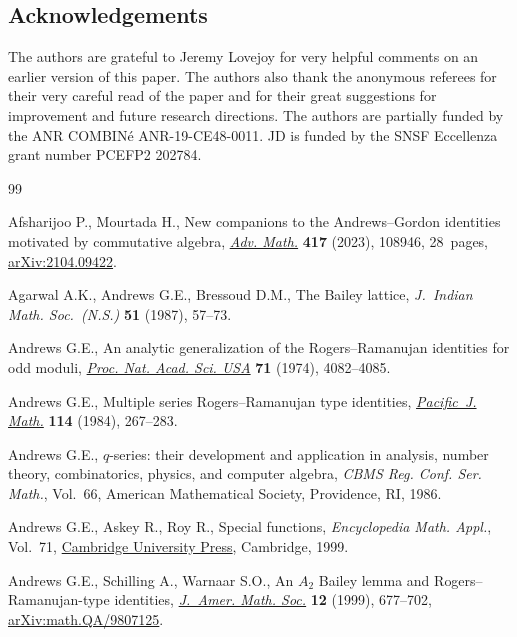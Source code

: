 \documentclass[pdftex]{sigma}
\numberwithin{equation}{section}
\begin{document}
\subsection*{Acknowledgements}

The authors are grateful to Jeremy Lovejoy for very helpful comments on an earlier version of this paper. The authors also thank the anonymous referees for their very careful read of the paper and for their great suggestions for improvement and future research directions.
The authors are partially funded by the ANR COMBIN\'e
ANR-19-CE48-0011. JD is funded by the SNSF Eccellenza grant number PCEFP2 202784.

\begin{thebibliography}{99}
\footnotesize\itemsep=0pt

Afsharijoo P., Mourtada H., New companions to the {A}ndrews--{G}ordon
 identities motivated by commutative algebra, \href{https://doi.org/10.1016/j.aim.2023.108946}{\textit{Adv. Math.}} \textbf{417}
 (2023), 108946, 28~pages, \href{https://arxiv.org/abs/2104.09422}{arXiv:2104.09422}.

Agarwal A.K., Andrews G.E., Bressoud D.M., The {B}ailey lattice,
 \textit{J.~Indian Math. Soc.~(N.S.)} \textbf{51} (1987), 57--73.

Andrews G.E., An analytic generalization of the {R}ogers--{R}amanujan
 identities for odd moduli, \href{https://doi.org/10.1073/pnas.71.10.4082}{\textit{Proc. Nat. Acad. Sci. USA}} \textbf{71}
 (1974), 4082--4085.

Andrews G.E., Multiple series {R}ogers--{R}amanujan type identities,
 \href{https://doi.org/10.2140/pjm.1984.114.267}{\textit{Pacific~J. Math.}} \textbf{114} (1984), 267--283.

Andrews G.E., {$q$}-series: their development and application in analysis,
 number theory, combinatorics, physics, and computer algebra, \textit{CBMS
 Reg. Conf. Ser. Math.}, Vol.~66, American Mathematical Society, Providence,
 RI, 1986.

Andrews G.E., Askey R., Roy R., Special functions, \textit{Encyclopedia Math.
 Appl.}, Vol.~71, \href{https://doi.org/10.1017/CBO9781107325937}{Cambridge University Press}, Cambridge, 1999.

Andrews G.E., Schilling A., Warnaar S.O., An {$A_2$} {B}ailey lemma and
 {R}ogers--{R}amanujan-type identities, \href{https://doi.org/10.1090/S0894-0347-99-00297-0}{\textit{J.~Amer. Math. Soc.}}
 \textbf{12} (1999), 677--702, \href{https://arxiv.org/abs/math.QA/9807125}{arXiv:math.QA/9807125}.


\end{thebibliography}
\end{document}
